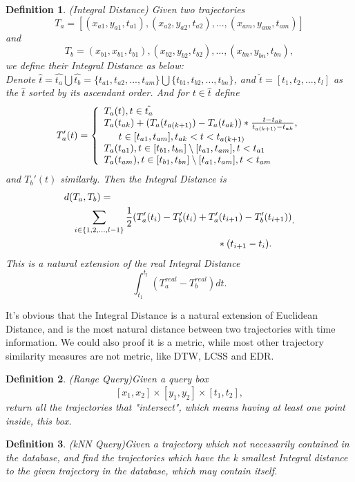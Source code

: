 \documentclass[sigplan]{acmart}
\newtheorem{myDef}{Definition}
\begin{document}
\begin{myDef}
  (Integral Distance) Given two trajectories $$T_a=[(x_{a1},y_{a1},t_{a1}), (x_{a2},y_{a2},t_{a2}), ..., (x_{am},y_{am},t_{am})]$$ and $$T_b=(x_{b1},x_{b1},t_{b1}), (x_{b2}, y_{b2}, t_{b2}), ..., (x_{bn}, y_{bn}, t_{bn}),$$ we define their Integral Distance as below:\\
  Denote $\hat{t}=\hat{t_a}\bigcup\hat{t_b}=\{t_{a1}, t_{a2}, ..., t_{am}\}\bigcup \{t_{b1}, t_{b2}, ..., t_{bn}\}$, and $\check{t}=[t_1, t_2, ..., t_l]$ as the $\hat{t}$ sorted by its ascendant order. And for $t \in \hat{t}$ define
  $$T_a'(t)=\left\{
             \begin{array}{lr}
             T_a(t), t \in \hat{t_a} \\
             T_a(t_{ak})+ (T_a(t_{a(k+1)})-T_a(t_{ak}))* \frac{t-t_{ak}}{t_{a(k+1)}-t_{ak}}, \\
             \indent  t \in [t_{a1}, t_{am}], t_{ak}<t<t_{a(k+1)} \\
             T_a(t_{a1}), t \in [t_{b1},t_{bn}] \setminus [t_{a1},t_{am}], t< t_{a1} \\
             T_a(t_{am}), t \in [t_{b1},t_{bn}] \setminus [t_{a1},t_{am}], t< t_{am}
             \end{array}
    \right.$$
  and $T_b'(t)$ similarly. Then the Integral Distance is
  $$
  \begin{aligned}
  d(&T_a,T_b)=\\
  &\sum_{i \in \{1, 2, ..., l-1\}} \frac{1}{2} (T_a'(t_i)-T_b'(t_i)+T_a'(t_{i+1})-T_b'(t_{i+1}))\\
  &\indent\indent\indent\indent\indent\indent\indent\indent\indent\indent*(t_{i+1}-t_i).
  \end{aligned}.
  $$
  This is a natural extension of the real Integral Distance
  $$\int_{t_1}^{t_l}(T_{a}^{real}-T_{b}^{real})dt.$$\par
\end{myDef}\par
It's obvious that the Integral Distance is a natural extension of Euclidean Distance, and is the most natural distance between two trajectories with time information. We could also proof it is a metric, while most other trajectory similarity measures are not metric, like DTW, LCSS and EDR.
\begin{myDef}
  (Range Query)Given a query box $$[x_1,x_2] \times [y_1,y_2] \times [t_1,t_2],$$return all the trajectories that "intersect", which means having at least one point inside, this box.
\end{myDef}
\begin{myDef}
  (kNN Query)Given a trajectory which not necessarily contained in the database, and find the trajectories which have the k smallest Integral distance to the given trajectory in the database, which may contain itself.
\end{myDef}
\end{document}
